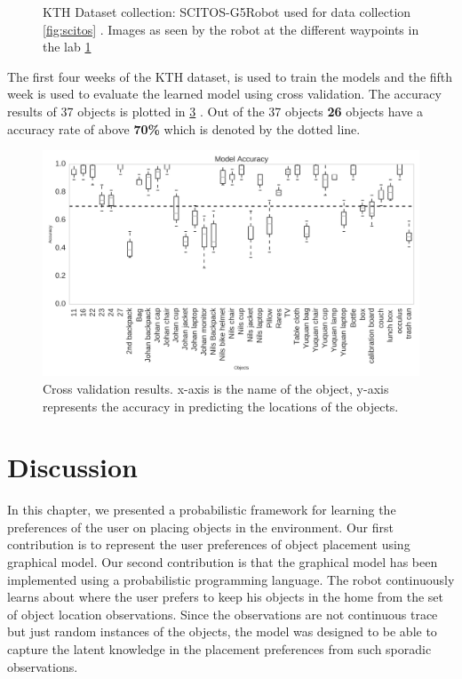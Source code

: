 \begin{figure}
\begin{subfigure}[b]{0.6\textwidth}
        \caption{}
        \label{fig:robot-view}
    \end{subfigure}
    \caption[KTH dataset collection]{KTH Dataset collection: SCITOS-G5\footnotemark Robot used for data collection \ref{fig:scitos} \protect. Images \footnotemark as seen by the robot at the different waypoints in the lab \ref{fig:robot-view}}\label{fig:kth-dataset}
\end{figure}





The first four weeks of the KTH dataset, is used to train the models and the fifth week is used to evaluate the learned model using cross validation. The accuracy results of 37 objects is plotted in \ref{fig:kth_object_evaluation} . 
Out of the 37 objects \textbf{26} objects have a accuracy rate of above \textbf{70\%} which is denoted by the dotted line. 

\begin{figure}[htp]
\centering
\includegraphics[width=\textwidth]{images/evaluation_kth.png}
\caption[Cross validation results]{Cross validation results. x-axis is the name of the object, y-axis represents the accuracy in predicting the locations of the objects. }
\label{fig:kth_object_evaluation}
\end{figure}

\FloatBarrier
\section{Discussion}
In this chapter, we presented a probabilistic framework for learning the preferences of the user on placing objects in the environment. Our first contribution is to represent the user preferences of object placement using graphical model. Our second contribution is that the graphical model has been implemented using a probabilistic programming language. The robot continuously learns about where the user prefers to keep his objects in the home from the set of object location observations. Since the observations are not continuous trace but just random instances of the objects, the model was designed to be able to capture the latent knowledge in the placement preferences from such sporadic observations.

